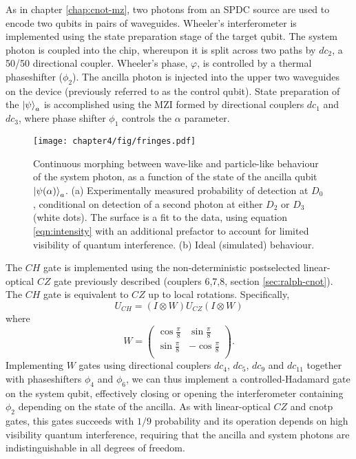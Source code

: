 As in chapter \ref{chap:cnot-mz}, two photons from an SPDC source are used to encode two qubits in pairs of waveguides. Wheeler's interferometer is implemented using the state preparation stage of the target qubit. The system photon is coupled into the chip, whereupon it is split across two paths by $dc_2$, a 50/50 directional coupler. Wheeler's phase, $\varphi$, is controlled by a thermal phaseshifter ($\phi_2$). 
The ancilla photon is injected into the upper two waveguides on the device (previously referred to as the control qubit). State preparation of the $\mbox{$ | \psi \rangle $}_a$ is accomplished using the MZI formed by directional couplers $dc_1$ and $dc_3$, where phase shifter $\phi_1$ controls the $\alpha$ parameter.

\begin{figure}[t]
\centering
\texttt{[image: chapter4/fig/fringes.pdf]}
\caption[Morphing between wave-like and particle-like behaviour.]{Continuous morphing between wave-like and particle-like behaviour of the system photon, as a function of the state of the ancilla qubit $\mbox{$ | \psi(\alpha) \rangle $}_a$. (a) Experimentally measured probability of detection at $D_0$, conditional on detection of a second photon at either $D_2$ or $D_3$ (white dots). The surface is a fit to the data, using equation \ref{eqn:intensity} with an additional prefactor to  account for limited visibility of quantum interference. (b) Ideal (simulated) behaviour.
}
\label{fig:delayed-choice-morph}
\end{figure}


The $CH$ gate is implemented using the non-deterministic postselected linear-optical $CZ$ gate previously described (couplers 6,7,8, section \ref{sec:ralph-cnot}). The $CH$ gate is equivalent to $CZ$ up to local rotations. Specifically, 
\begin{equation}
U_{CH} = (I \otimes W) U_{CZ} (I \otimes W)
\end{equation}
where 
\begin{equation}
W = 
\left(
\begin{array}{cccc}
\cos\frac{\pi}{8} & \sin\frac{\pi}{8} \\
\sin\frac{\pi}{8} & -\cos\frac{\pi}{8} \\
\end{array}
\right).
\end{equation}
Implementing $W$ gates using directional couplers $dc_4$, $dc_5$, $dc_{9}$ and $dc_{11}$ together with phaseshifters $\phi_4$ and $\phi_6$, we can thus implement a controlled-Hadamard gate on the system qubit, effectively closing or opening the interferometer containing $\phi_2$ depending on the state of the ancilla. As with linear-optical $CZ$ and \acrshort{cnotp} gates, this gates succeeds  with $1/9$ probability and its operation depends on high visibility quantum interference, requiring that the ancilla and system photons are indistinguishable in all degrees of freedom.

